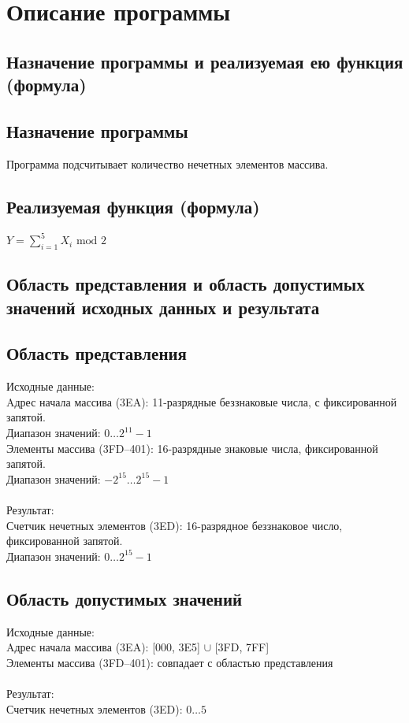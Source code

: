 \section{Описание программы}
\subsection{Назначение программы и реализуемая ею функция (формула)}
\subsection*{Назначение программы}
\noindent Программа подсчитывает количество нечетных элементов массива.

\subsection*{Реализуемая функция (формула)}

\noindent $Y=\sum_{i=1}^{5} X_{i} \text { mod } 2$

\subsection{Область представления и область допустимых значений исходных данных и результата}

\subsection*{Область представления}
\noindent
Исходные данные: \\
Aдрес начала массива (3EA): 11-разрядные беззнаковые числа, с фиксированной запятой.\\
Диапазон значений: $0\ldots2^{11}-1$ \\
Элементы массива (3FD--401): 16-разрядные знаковые числа, фиксированной запятой.\\
Диапазон значений:  $-2^{15}\ldots2^{15}-1$ \\\\
Результат: \\
Счетчик нечетных элементов (3ED): 16-разрядное беззнаковое число, фиксированной запятой.\\
Диапазон значений:  $0\ldots2^{15}-1$

\subsection*{Область допустимых значений}
\noindent Исходные данные: \\
Aдрес начала массива (3EA): [000, 3E5] $\cup$ [3FD, 7FF] \\
Элементы массива (3FD--401): совпадает с областью представления\\\\
Результат: \\
Счетчик нечетных элементов (3ED): $0\ldots5$

